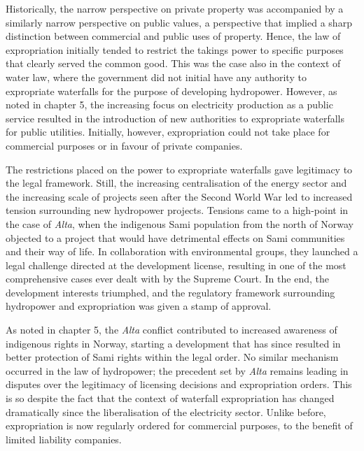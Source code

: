 Historically, the narrow perspective on private property was accompanied by a similarly narrow perspective on public values, a perspective that implied a sharp distinction between commercial and public uses of property. Hence, the law of expropriation initially tended to restrict the takings power to specific purposes that clearly served the common good. This was the case also in the context of water law, where the government did not initial have any authority to expropriate waterfalls for the purpose of developing hydropower. However, as noted in chapter 5, the increasing focus on electricity production as a public service resulted in the introduction of new authorities to expropriate waterfalls for public utilities. Initially, however, expropriation could not take place for commercial purposes or in favour of private companies.

The restrictions placed on the power to expropriate waterfalls gave legitimacy to the legal framework. Still, the increasing centralisation of the energy sector and the increasing scale of projects seen after the Second World War led to increased tension surrounding new hydropower projects. Tensions came to a high-point in the case of {\it Alta}, when the indigenous Sami population from the north of Norway objected to a project that would have detrimental effects on Sami communities and their way of life. In collaboration with environmental groups, they launched a legal challenge directed at the development license, resulting in one of the most comprehensive cases ever dealt with by the Supreme Court. In the end, the development interests triumphed, and the regulatory framework surrounding hydropower and expropriation was given a stamp of approval. 

As noted in chapter 5, the {\it Alta} conflict contributed to increased awareness of indigenous rights in Norway, starting a development that has since resulted in better protection of Sami rights within the legal order. No similar mechanism occurred in the law of hydropower; the precedent set by {\it Alta} remains leading in disputes over the legitimacy of licensing decisions and expropriation orders. This is so despite the fact that the context of waterfall expropriation has changed dramatically since the liberalisation of the electricity sector. Unlike before, expropriation is now regularly ordered for commercial purposes, to the benefit of limited liability companies.%

